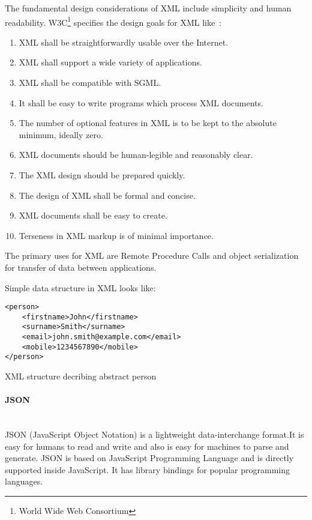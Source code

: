 The fundamental design considerations of XML include
simplicity and human readability\cite{NurseitovPRI09}.
W3C\footnote{World Wide Web Consortium} specifies the design goals for XML
like~\cite{w3c_xml}:
\begin{enumerate}
  \item XML shall be straightforwardly usable over the Internet.
  \item XML shall support a wide variety of applications.
  \item XML shall be compatible with SGML\footnotemark.
  \item It shall be easy to write programs which process XML documents.
  \item The number of optional features in XML is to be kept to the absolute minimum, ideally zero.
  \item XML documents should be human-legible and reasonably clear.
  \item The XML design should be prepared quickly.
  \item The design of XML shall be formal and concise.
  \item XML documents shall be easy to create.
  \item Terseness in XML markup is of minimal importance.  
\end{enumerate}

The primary uses for XML are Remote Procedure Calls and object serialization for transfer of
data between applications. 

Simple data structure in XML looks like:

\begin{listing}[H]
\begin{verbatim}
<person>
	<firstname>John</firstname>
	<surname>Smith</surname>
	<email>john.smith@example.com</email>
	<mobile>1234567890</mobile>
</person>
\end{verbatim}
\caption{XML structure decribing abstract person}
\label{lst:xml_person_example}
\end{listing}


\paragraph{JSON} ~\\
JSON (JavaScript Object Notation) is a lightweight data-interchange
format\cite{json_org}.It is easy for humans to read and write and also is
easy for machines to parse and generate. JSON is based on JavaScript
Programming Language and is directly supported inside JavaScript. It has library
bindings for popular programming languages.

